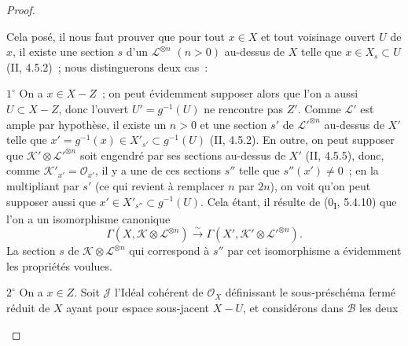 \begin{proof}
\begin{env}[2.6.2.5]
Cela posé, il nous faut prouver que pour tout $x\in X$ et tout voisinage
ouvert $U$ de $x$, il existe une section $s$ d'un
$\mathcal L^{\otimes n}$ $(n>0)$ au-dessus de $X$ telle que
$x\in X_s\subset U$ (II, 4.5.2)~; nous distinguerons deux cas~:

$1^\circ$ On a $x\in X-Z$~; on peut évidemment supposer alors que l'on a
aussi $U\subset X-Z$, donc l'ouvert $U'=g^{-1}(U)$ ne rencontre pas
$Z'$. Comme $\mathcal L'$ est ample par hypothèse, il existe un $n>0$ et
une section $s'$ de $\mathcal L'^{\otimes n}$ au-dessus de $X'$ telle
que $x'=g^{-1}(x)\in X'_{s'}\subset g^{-1}(U)$ (II, 4.5.2). En outre, on
peut supposer que $\mathcal K'\otimes\mathcal L'^{\otimes n}$ soit
engendré par ses sections au-dessus de $X'$ (II, 4.5.5), donc, comme
$\mathcal K'_{x'}=\mathcal O_{x'}$, il y a une de ces sections $s''$
telle que $s''(x')\neq0$~; en la multipliant par $s'$ (ce qui revient à
remplacer $n$ par $2n$), on voit qu'on peut supposer aussi que
$x'\in X'_{s''}\subset g^{-1}(U)$. Cela étant, il résulte de
(0\textsubscript{I}, 5.4.10) que l'on a un isomorphisme canonique
\[
\Gamma(X,\mathcal K\otimes\mathcal L^{\otimes n})
\xrightarrow{\sim}
\Gamma(X',\mathcal K'\otimes\mathcal L'^{\otimes n}).
\]
La section $s$ de $\mathcal K\otimes\mathcal L^{\otimes n}$ qui
correspond à $s''$ par cet isomorphisme a évidemment les propriétés
voulues.

$2^\circ$ On a $x\in Z$. Soit $\mathcal J$ l'Idéal cohérent de
$\mathcal O_X$ définissant le sous-préschéma fermé réduit de $X$ ayant
pour espace sous-jacent $X-U$, et considérons dans $\mathcal B$ les deux


\end{env}
\end{proof}
